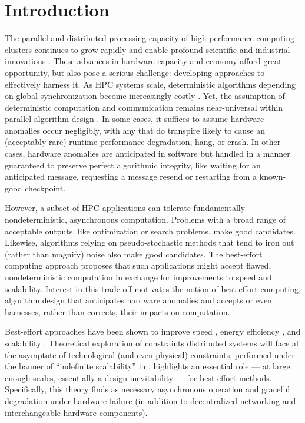 \section{Introduction}

The parallel and distributed processing capacity of high-performance computing clusters continues to grow rapidly and enable profound scientific and industrial innovations \cite{gagliardi2019international}.
These advances in hardware capacity and economy afford great opportunity, but also pose a serious challenge: developing approaches to effectively harness it.
As HPC systems scale, deterministic algorithms depending on global synchronization become increasingly costly \cite{gropp2013programming,dongarra2014applied}.
Yet, the assumption of deterministic computation and communication remains near-universal within parallel algorithm design \cite{chakradhar2010best}.
In some cases, it suffices to assume hardware anomalies occur negligibly, with any that do transpire likely to cause an (acceptably rare) runtime performance degradation, hang, or crash.
In other cases, hardware anomalies are anticipated in software but handled in a manner guaranteed to preserve perfect algorithmic integrity, like waiting for an anticipated message, requesting a message resend or restarting from a known-good checkpoint.

However, a subset of HPC applications can tolerate fundamentally nondeterministic, asynchronous computation.
Problems with a broad range of acceptable outputs, like optimization or search problems, make good candidates.
Likewise, algorithms relying on pseudo-stochastic methods that tend to iron out (rather than magnify) noise also make good candidates.
The best-effort computing approach proposes that such applications might accept flawed, nondeterministic computation in exchange for improvements to speed and scalability.
Interest in this trade-off motivates the notion of best-effort computing, algorithm design that anticipates hardware anomalies and accepts or even harnesses, rather than corrects, their impacts on computation.

Best-effort approaches have been shown to improve speed \cite{chakrapani2008probabilistic}, energy efficiency \cite{bocquet2018memory}, and scalability \cite{meng2009best}.
Theoretical exploration of constraints distributed systems will face at the asymptote of technological (and even physical) constraints, performed under the banner of ``indefinite scalability'' in \cite{ackley2011pursue}, highlights an essential role --- at large enough scales, essentially a design inevitability --- for best-effort methods.
Specifically, this theory finds as necessary asynchronous operation and graceful degradation under hardware failure (in addition to decentralized networking and interchangeable hardware components).

